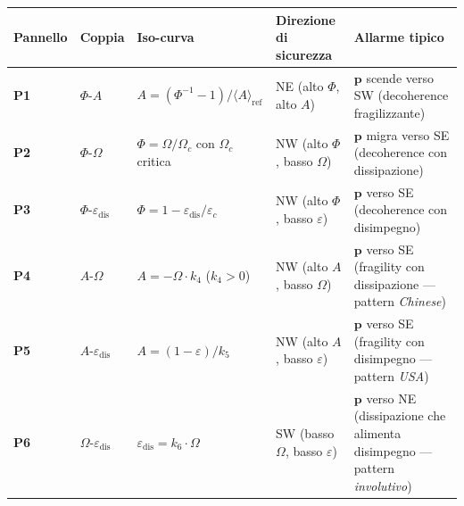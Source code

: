 {\def\LTcaptype{none} %
{\small\begin{longtable}[]{@{}
  >{\raggedright\arraybackslash}p{}
  >{\raggedright\arraybackslash}p{}
  >{\raggedright\arraybackslash}p{}
  >{\raggedright\arraybackslash}p{}
  >{\raggedright\arraybackslash}p{}@{}}
\toprule\noalign{}
\begin{minipage}[b]{\linewidth}\raggedright
Pannello
\end{minipage} & \begin{minipage}[b]{\linewidth}\raggedright
Coppia
\end{minipage} & \begin{minipage}[b]{\linewidth}\raggedright
Iso-curva
\end{minipage} & \begin{minipage}[b]{\linewidth}\raggedright
Direzione di sicurezza
\end{minipage} & \begin{minipage}[b]{\linewidth}\raggedright
Allarme tipico
\end{minipage} \\
\midrule\noalign{}
\endhead
\bottomrule\noalign{}
\endlastfoot
\textbf{P1} & \(\Phi\)-\(A\) &
\(A = (\Phi^{-1} - 1)/\langle A\rangle_{\text{ref}}\) & NE (alto
\(\Phi\), alto \(A\)) & \(\boldsymbol{p}\) scende verso SW (decoherence
fragilizzante) \\
\textbf{P2} & \(\Phi\)-\(\Omega\) & \(\Phi = \Omega/\Omega_c\) con
\(\Omega_c\) critica & NW (alto \(\Phi\), basso \(\Omega\)) &
\(\boldsymbol{p}\) migra verso SE (decoherence con dissipazione) \\
\textbf{P3} & \(\Phi\)-\(\varepsilon_{\text{dis}}\) &
\(\Phi = 1 - \varepsilon_{\text{dis}}/\varepsilon_c\) & NW (alto
\(\Phi\), basso \(\varepsilon\)) & \(\boldsymbol{p}\) verso SE
(decoherence con disimpegno) \\
\textbf{P4} & \(A\)-\(\Omega\) & \(A = -\Omega \cdot k_4\) (\(k_4 > 0\))
& NW (alto \(A\), basso \(\Omega\)) & \(\boldsymbol{p}\) verso SE
(fragility con dissipazione --- pattern \emph{Chinese}) \\
\textbf{P5} & \(A\)-\(\varepsilon_{\text{dis}}\) &
\(A = (1 - \varepsilon)/k_5\) & NW (alto \(A\), basso \(\varepsilon\)) &
\(\boldsymbol{p}\) verso SE (fragility con disimpegno --- pattern
\emph{USA}) \\
\textbf{P6} & \(\Omega\)-\(\varepsilon_{\text{dis}}\) &
\(\varepsilon_{\text{dis}} = k_6 \cdot \Omega\) & SW (basso \(\Omega\),
basso \(\varepsilon\)) & \(\boldsymbol{p}\) verso NE (dissipazione che
alimenta disimpegno --- pattern \emph{involutivo}) \\
\end{longtable}}
}

